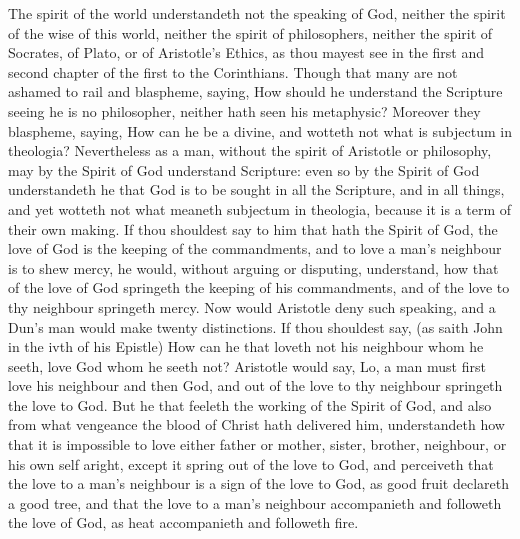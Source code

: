 The spirit of the world understandeth not the speaking 
of God, neither the spirit of the wise of this world, 
neither the spirit of philosophers, neither the spirit of 
Socrates, of Plato, or of Aristotle's Ethics, as thou mayest 
see in the first and second chapter of the first to the Corinthians.
Though that many are not ashamed to rail and 
blaspheme, saying, How should he understand the Scripture 
seeing he is no philosopher, neither hath seen his metaphysic?
Moreover they blaspheme, saying, How can he 
be a divine, and wotteth not what is subjectum in theologia?
Nevertheless as a man, without the spirit of Aristotle
or philosophy, may by the Spirit of God understand 
Scripture: even so by the Spirit of God understandeth he 
that God is to be sought in all the Scripture, and in all 
things, and yet wotteth not what meaneth subjectum in 
theologia, because it is a term of their own making. If 
thou shouldest say to him that hath the Spirit of God, the 
love of God is the keeping of the commandments, and to 
love a man's neighbour is to shew mercy, he would, without 
arguing or disputing, understand, how that of the love of 
God springeth the keeping of his commandments, and of 
the love to thy neighbour springeth mercy. Now would 
Aristotle deny such speaking, and a Dun's man would 
make twenty distinctions. If thou shouldest say, (as saith 
John in the ivth of his Epistle) How can he that loveth 
not his neighbour whom he seeth, love God whom he seeth 
not? Aristotle would say, Lo, a man must first love his 
neighbour and then God, and out of the love to thy neighbour
springeth the love to God. But he that feeleth the 
working of the Spirit of God, and also from what vengeance
the blood of Christ hath delivered him, understandeth 
how that it is impossible to love either father or mother, 
sister, brother, neighbour, or his own self aright, except it 
spring out of the love to God, and perceiveth that the love 
to a man's neighbour is a sign of the love to God, as good 
fruit declareth a good tree, and that the love to a man's 
neighbour accompanieth and followeth the love of God, as 
heat accompanieth and followeth fire. 


